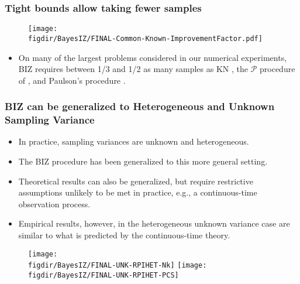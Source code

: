 \documentclass[13pt]{beamer}
\newcommand{\figdir}{../../fig}
\begin{document}
\begin{frame}
  \frametitle{Tight bounds allow taking fewer samples}
  \begin{figure}[tb]
    \center
    \texttt{[image: \\figdir/BayesIZ/FINAL-Common-Known-ImprovementFactor.pdf]}
  \end{figure}
  \begin{itemize}
    \item On many of the largest problems considered in our numerical experiments, BIZ requires between 1/3 and 1/2 as many samples as KN \cite{KiNe01}, the $\mathcal{P}$ procedure of \cite{Wang2011b}, and Paulson's procedure \cite{Pa64}.  
  \end{itemize}
\end{frame}


\begin{frame}
  \frametitle{BIZ can be generalized to Heterogeneous and Unknown Sampling Variance}

  \begin{itemize}
    \item In practice, sampling variances are unknown and heterogeneous.
    \item The BIZ procedure has been generalized to this more general setting.
    \item Theoretical results can also be generalized, but require restrictive assumptions unlikely to be met in practice, e.g., a continuous-time observation process.
    \item Empirical results, however, in the heterogeneous unknown variance case are similar to what is predicted by the continuous-time theory.
  \end{itemize}
  \begin{figure}
    \center
    \texttt{[image: \\figdir/BayesIZ/FINAL-UNK-RPIHET-Nk]} \texttt{[image: \\figdir/BayesIZ/FINAL-UNK-RPIHET-PCS]}
  \end{figure}
\end{frame}
\end{document}
